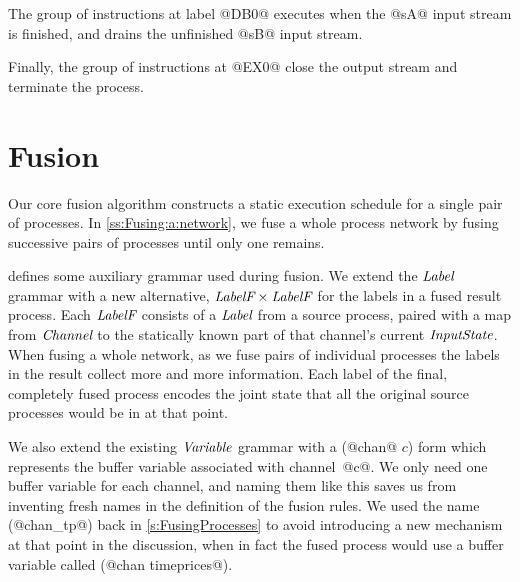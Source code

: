 
The group of instructions at label @DB0@ executes when the @sA@ input stream is finished, and drains the unfinished @sB@ input stream.

Finally, the group of instructions at @EX0@ close the output stream and terminate the process.



\section{Fusion}
\label{s:Fusion}

Our core fusion algorithm constructs a static execution schedule for a single pair of processes.
In \cref{ss:Fusing:a:network}, we fuse a whole process network by fusing successive pairs of processes until only one remains.

 defines some auxiliary grammar used during fusion. We extend the $\textit{Label}$ grammar with a new alternative, $\textit{LabelF} \times \textit{LabelF}$ for the labels in a fused result process. Each $\textit{LabelF}$ consists of a $\textit{Label}$ from a source process, paired with a map from $\textit{Channel}$ to the statically known part of that channel's current $\textit{InputState}$. When fusing a whole network, as we fuse pairs of individual processes the labels in the result collect more and more information. Each label of the final, completely fused process encodes the joint state that all the original source processes would be in at that point.



We also extend the existing $\textit{Variable}$ grammar with a (@chan@ $c$) form which represents the buffer variable associated with \mbox{channel @c@}. We only need one buffer variable for each channel, and naming them like this saves us from inventing fresh names in the definition of the fusion rules.
We used the name (@chan_tp@) back in \cref{s:FusingProcesses} to avoid introducing a new mechanism at that point in the discussion, when in fact the fused process would use a buffer variable called (@chan timeprices@).

